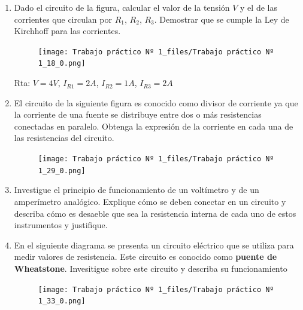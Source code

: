 \documentclass[10pt,a4paper]{article}
\begin{document}
\begin{enumerate}

\item Dado el circuito de la figura, calcular el valor de la tensión $V$ y el de las corrientes que circulan por $R_1$, $R_2$, $R_3$. Demostrar que se cumple la Ley de Kirchhoff para las corrientes.

\begin{figure}[H]
	\centering
	\texttt{[image: Trabajo práctico Nº 1\_files/Trabajo práctico Nº 1\_18\_0.png]}
	
	\label{e5}
	
\end{figure}

Rta: $V=4V$,
$I_{R1} = 2A$,
$I_{R2} = 1A$,
$I_{R3} = 2A$
\item El circuito de la siguiente figura es conocido como divisor de corriente ya que la corriente de una fuente se distribuye entre dos o más resistencias conectadas en paralelo. Obtenga la expresión de la corriente en cada una de las resistencias del circuito.

\begin{figure}[H]
	\centering
	\texttt{[image: Trabajo práctico Nº 1\_files/Trabajo práctico Nº 1\_29\_0.png]}
	\label{e6}
\end{figure}



\item Investigue el principio de funcionamiento de un voltímetro y de un amperímetro analógico. Explique cómo se deben conectar en un circuito y describa cómo es desaeble que sea la resistencia interna de cada uno de estos instrumentos y justifique.


\item  En el siguiente diagrama se presenta un circuito eléctrico que se utiliza para medir valores de resistencia. Este circuito es conocido como \textbf{puente de Wheatstone}. Invesitigue sobre este circuito y describa su funcionamiento

\begin{figure}[H]
	\centering
	\texttt{[image: Trabajo práctico Nº 1\_files/Trabajo práctico Nº 1\_33\_0.png]}
	\label{e8}
\end{figure}


\end{enumerate}
\end{document}
